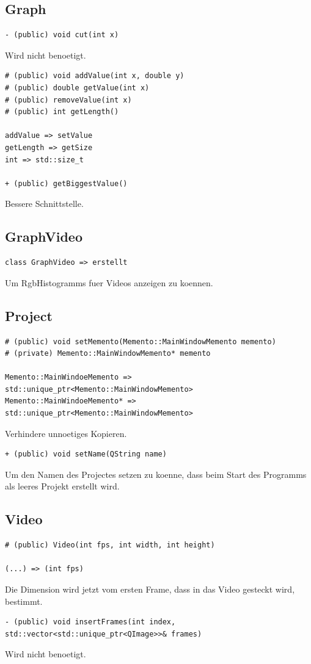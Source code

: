 \documentclass[parskip=full]{scrartcl}
\begin{document}
\subsection{Graph}
\begin{verbatim}
- (public) void cut(int x)
\end{verbatim}
Wird nicht benoetigt.
\begin{verbatim}
# (public) void addValue(int x, double y)
# (public) double getValue(int x)
# (public) removeValue(int x)
# (public) int getLength()

addValue => setValue
getLength => getSize
int => std::size_t

+ (public) getBiggestValue()
\end{verbatim}
Bessere Schnittstelle.
\subsection{GraphVideo}
\begin{verbatim}
class GraphVideo => erstellt
\end{verbatim}
Um RgbHistogramms fuer Videos anzeigen zu koennen.
\subsection{Project}
\begin{verbatim}
# (public) void setMemento(Memento::MainWindowMemento memento)
# (private) Memento::MainWindowMemento* memento

Memento::MainWindoeMemento => std::unique_ptr<Memento::MainWindowMemento>
Memento::MainWindoeMemento* => std::unique_ptr<Memento::MainWindowMemento>
\end{verbatim}
Verhindere unnoetiges Kopieren.
\begin{verbatim}
+ (public) void setName(QString name)
\end{verbatim}
Um den Namen des Projectes setzen zu koenne, dass beim Start des Programms als leeres Projekt erstellt wird.
\subsection{Video}
\begin{verbatim}
# (public) Video(int fps, int width, int height)

(...) => (int fps)
\end{verbatim}
Die Dimension wird jetzt vom ersten Frame, dass in das Video gesteckt wird, bestimmt.

\begin{verbatim}
- (public) void insertFrames(int index, std::vector<std::unique_ptr<QImage>>& frames)
\end{verbatim}
Wird nicht benoetigt.
\end{document}
